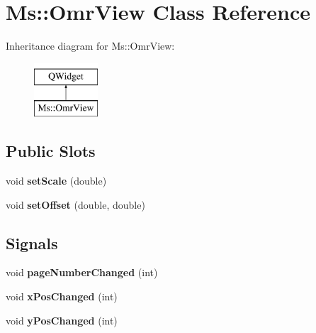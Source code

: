 \hypertarget{class_ms_1_1_omr_view}{}\section{Ms\+:\+:Omr\+View Class Reference}
\label{class_ms_1_1_omr_view}
Inheritance diagram for Ms\+:\+:Omr\+View\+:\begin{figure}[H]
\begin{center}
\leavevmode
\includegraphics[height=2.000000cm]{class_ms_1_1_omr_view}
\end{center}
\end{figure}
\subsection*{Public Slots}
\begin{DoxyCompactItemize}
\item 
\mbox{\label{class_ms_1_1_omr_view_a537bc9277489f610856fc3056dadeab9}} 
void {\bfseries set\+Scale} (double)
\item 
\mbox{\label{class_ms_1_1_omr_view_a80c4731f0bed5f8e73bba02aac0c1ce0}} 
void {\bfseries set\+Offset} (double, double)
\end{DoxyCompactItemize}
\subsection*{Signals}
\begin{DoxyCompactItemize}
\item 
\mbox{\label{class_ms_1_1_omr_view_af7039262acfa031c96a3e92c4ae65df4}} 
void {\bfseries page\+Number\+Changed} (int)
\item 
\mbox{\label{class_ms_1_1_omr_view_afefcf8c21f4eec0c42c28efaaf4edcc6}} 
void {\bfseries x\+Pos\+Changed} (int)
\item 
\mbox{\label{class_ms_1_1_omr_view_a20d60e56d59bbfc65b592351c288072f}} 
void {\bfseries y\+Pos\+Changed} (int)
\end{DoxyCompactItemize}
